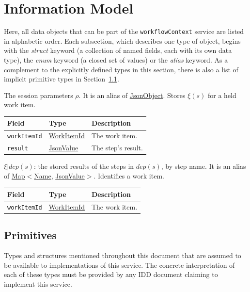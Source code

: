 \documentclass[a4paper]{arrowhead}
\newcommand{\pref}[1]{{\textcolor{ArrowheadGrey}{\hyperref[sec:model:primitives:#1]{#1}}}}
\begin{document}
\newpage
\section{Information Model}
\label{sec:model}
Here, all data objects that can be part of the \texttt{workflow\allowbreak{}Context} service are listed in alphabetic order. Each
subsection, which describes one type of object, begins with the \textit{struct} keyword (a collection of named fields,
each with its own data type), the \textit{enum} keyword (a closed set of values) or the \textit{alias} keyword. As a
complement to the explicitly defined types in this section, there is also a list of implicit primitive types in
Section~\ref{sec:model:primitives}.

The session parameters $\rho$.
 It is an alias of \pref{JsonObject}.
Stores $\xi(s)$ for a held work item.

{\small
\begin{longtable}{|p{3.9cm}|p{4.4cm}|p{7.5cm}|}

\hline
\rowcolor{gray!33} Field & Type & Description \\ \hline
\endhead
\texttt{workItemId} & \pref{WorkItemId} & The work item. \\ \hline
\texttt{result} & \pref{JsonValue} & The step's result. \\ \hline
\end{longtable}
}

$\xi|dep(s)$: the stored results of the steps in $dep(s)$, by step name.
 It is an alias of \pref{Map}$<$\pref{Name}, \pref{JsonValue}$>$.
Identifies a work item.

{\small
\begin{longtable}{|p{3.9cm}|p{4.4cm}|p{7.5cm}|}

\hline
\rowcolor{gray!33} Field & Type & Description \\ \hline
\endhead
\texttt{workItemId} & \pref{WorkItemId} & The work item. \\ \hline
\end{longtable}
}


\subsection{Primitives}
\label{sec:model:primitives}
Types and structures mentioned throughout this document that are assumed to be available to implementations of this
service. The concrete interpretation of each of these types must be provided by any IDD document claiming to implement
this service.
\end{document}
